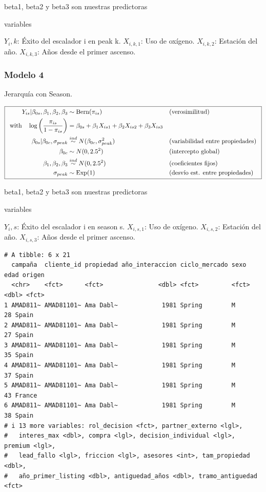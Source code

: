 \documentclass[
  letterpaper,
  DIV=11,
  numbers=noendperiod]{scrartcl}
\begin{document}
beta1, beta2 y beta3 son nuestras predictoras

variables

\(Y_i,k\): Éxito del escalador i en peak k. \(X_{i,k,1}\): Uso de
oxígeno. \(X_{i,k,2}\): Estación del año. \(X_{i,k,3}\): Años desde el
primer ascenso.

\subsubsection{Modelo 4}\label{modelo-4}

Jerarquía con Season.

\[\boxed{
\hspace{0.5em}
\begin{aligned}
Y_{is} | \beta_{0s}, \beta_1, \beta_2, \beta_3 & \sim \text{Bern}(\pi_{is}) && \text{(verosimilitud)} \\
\text{with} \quad \log\left(\frac{\pi_{is}}{1-\pi_{is}}\right) & = \beta_{0s} + \beta_1 X_{is1} + \beta_2 X_{is2} + \beta_3 X_{is3} \\
\beta_{0s} | \beta_{0c}, \sigma_{peak} & \overset{ind}{\sim} N(\beta_{0c}, \sigma_{peak}^2) && \text{(variabilidad entre propiedades)} \\
\beta_{0c} & \sim N(0, 2.5^2) && \text{(intercepto global)} \\
\beta_1, \beta_2, \beta_3 & \overset{ind}{\sim} N(0, 2.5^2) && \text{(coeficientes fijos)} \\
\sigma_{peak} & \sim \text{Exp}(1) && \text{(desvío est. entre propiedades)}
\end{aligned}
\hspace{0.5em}
}\]

beta1, beta2 y beta3 son nuestras predictoras

variables

\(Y_i,s\): Éxito del escalador i en season s. \(X_{i,s,1}\): Uso de
oxígeno. \(X_{i,s,2}\): Estación del año. \(X_{i,s,3}\): Años desde el
primer ascenso.

\begin{verbatim}
# A tibble: 6 x 21
  campaña  cliente_id propiedad año_interaccion ciclo_mercado sexo   edad origen
  <chr>    <fct>      <fct>               <dbl> <fct>         <fct> <dbl> <fct> 
1 AMAD811~ AMAD81101~ Ama Dabl~            1981 Spring        M        28 Spain 
2 AMAD811~ AMAD81101~ Ama Dabl~            1981 Spring        M        27 Spain 
3 AMAD811~ AMAD81101~ Ama Dabl~            1981 Spring        M        35 Spain 
4 AMAD811~ AMAD81101~ Ama Dabl~            1981 Spring        M        37 Spain 
5 AMAD811~ AMAD81101~ Ama Dabl~            1981 Spring        M        43 France
6 AMAD811~ AMAD81101~ Ama Dabl~            1981 Spring        M        38 Spain 
# i 13 more variables: rol_decision <fct>, partner_externo <lgl>,
#   interes_max <dbl>, compra <lgl>, decision_individual <lgl>, premium <lgl>,
#   lead_fallo <lgl>, friccion <lgl>, asesores <int>, tam_propiedad <dbl>,
#   año_primer_listing <dbl>, antiguedad_años <dbl>, tramo_antiguedad <fct>
\end{verbatim}
\end{document}
